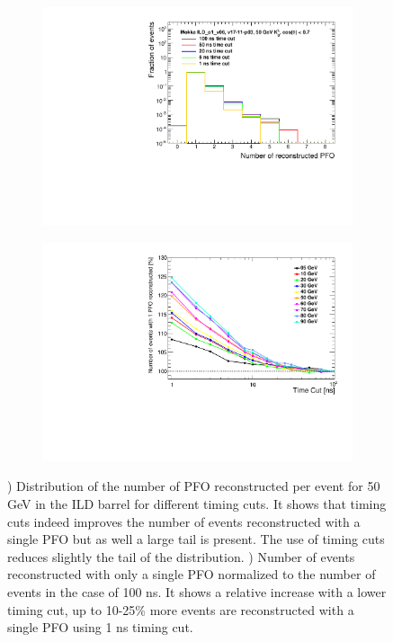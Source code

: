\begin{figure}[htbp!]
  \centering
  \begin{subfigure}[t]{0.49\textwidth}
    \centering
    \includegraphics[width=1\linewidth]{../Thesis_Plots/ILD/AdditionalPlots/Plots/NumberReconstructedPFO_TimeCuts_50GeV}
    \caption{} \label{fig:DistriPFO}
  \end{subfigure}
  \begin{subfigure}[t]{0.49\textwidth}
    \centering
    \includegraphics[width=1\linewidth]{../Thesis_Plots/ILD/NoSmearing/Plots/NumberEvents_PFO_TimeCuts_noSmearing}
    \caption{} \label{fig:EventRecoPFO}
  \end{subfigure}
  \caption{) Distribution of the number of PFO reconstructed per event for 50 GeV \kzeroL{} in the ILD barrel for different timing cuts. It shows that timing cuts indeed improves the number of events reconstructed with a single PFO but as well a large tail is present. The use of timing cuts reduces slightly the tail of the distribution. ) Number of events reconstructed with only a single PFO normalized to the number of events in the case of 100 ns. It shows a relative increase with a lower timing cut, up to 10-25\% more events are reconstructed with a single PFO using 1 ns timing cut.}
\end{figure}

